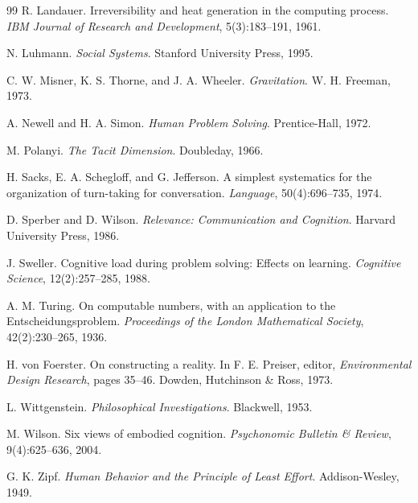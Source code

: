 \documentclass[12pt]{article}
\theoremstyle{remark}
\begin{document}
\begin{thebibliography}{99}
R. Landauer.
\newblock Irreversibility and heat generation in the computing process.
\newblock \emph{IBM Journal of Research and Development}, 5(3):183--191, 1961.

N. Luhmann.
\newblock \emph{Social Systems}.
\newblock Stanford University Press, 1995.

C. W. Misner, K. S. Thorne, and J. A. Wheeler.
\newblock \emph{Gravitation}.
\newblock W. H. Freeman, 1973.

A. Newell and H. A. Simon.
\newblock \emph{Human Problem Solving}.
\newblock Prentice-Hall, 1972.

M. Polanyi.
\newblock \emph{The Tacit Dimension}.
\newblock Doubleday, 1966.

H. Sacks, E. A. Schegloff, and G. Jefferson.
\newblock A simplest systematics for the organization of turn-taking for conversation.
\newblock \emph{Language}, 50(4):696--735, 1974.

D. Sperber and D. Wilson.
\newblock \emph{Relevance: Communication and Cognition}.
\newblock Harvard University Press, 1986.

J. Sweller.
\newblock Cognitive load during problem solving: Effects on learning.
\newblock \emph{Cognitive Science}, 12(2):257--285, 1988.

A. M. Turing.
\newblock On computable numbers, with an application to the Entscheidungsproblem.
\newblock \emph{Proceedings of the London Mathematical Society}, 42(2):230--265, 1936.

H. von Foerster.
\newblock On constructing a reality.
\newblock In F. E. Preiser, editor, \emph{Environmental Design Research}, pages 35--46. Dowden, Hutchinson \& Ross, 1973.

L. Wittgenstein.
\newblock \emph{Philosophical Investigations}.
\newblock Blackwell, 1953.

M. Wilson.
\newblock Six views of embodied cognition.
\newblock \emph{Psychonomic Bulletin \& Review}, 9(4):625--636, 2004.

G. K. Zipf.
\newblock \emph{Human Behavior and the Principle of Least Effort}.
\newblock Addison-Wesley, 1949.

\end{thebibliography}
\end{document}
